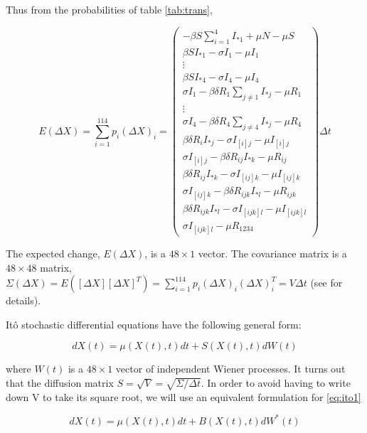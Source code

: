 \documentclass[12pt]{article}
\begin{document}
 



Thus from the probabilities of table \ref{tab:trans},

\begin{equation}
 E(\Delta X)=\sum_{i=1}^{114} p_i (\Delta X)_i=
\begin{pmatrix}
-\beta S \sum_{i=1}^4 I_{*1} + \mu N -\mu S\\
\beta S I_{*1} -\sigma I_1 -\mu I_1\\
\vdots\\
\beta S I_{*4} -\sigma I_4 -\mu I_4\\
\sigma I_1 - \beta \delta R_1 \sum_{j\neq 1} I_{*j} -\mu R_1\\
\vdots\\
\sigma I_4 - \beta \delta R_4 \sum_{j\neq 4} I_{*j} -\mu R_4\\
\beta \delta R_i I_{*j} - \sigma I_{[i]j} -\mu I_{[i]j}\\ 
\sigma I_{[i]j} - \beta \delta R_{ij} I_{*k} - \mu R_{ij}\\
\beta \delta R_{ij} I_{*k} -\sigma I_{[ij]k} -\mu I_{[ij]k}\\ 
\sigma I_{[ij]k} - \beta \delta R_{ijk} I_{*l} -\mu R_{ijk}\\
\beta \delta R_{ijk} I_{*l} - \sigma I_{[ijk]l} - \mu I_{[ijk]l} \\
\sigma I_{[ijk]l} - \mu R_{1234}
\end{pmatrix}
 \Delta t
\end{equation}

The expected change, $E(\Delta X)$, is a $48\times 1$ vector. The covariance 
matrix is a $48\times 48$ matrix, $\Sigma(\Delta X)= E([\Delta X][\Delta X]^T) 
=\sum_{i=1}^{114} p_i (\Delta X)_i (\Delta X)_i^T = V \Delta t$ (see 
\citet{allen_modeling_2007} for details).

Itô stochastic differential equations have the following general form:

\begin{equation}
\label{eq:ito1}
 d X(t) = \mu(X(t),t) dt + S(X(t),t) dW(t)
\end{equation}

where $W(t)$ is a $48\times1$ vector of independent Wiener processes. It turns 
out that the 
diffusion matrix $S=\sqrt{V} = \sqrt{\Sigma/\Delta t}$. In order to avoid 
having to write down V to take its square root, we will use an equivalent 
formulation for \ref{eq:ito1}

\begin{equation}
\label{eq:ito2}
 d X(t) = \mu(X(t),t) dt + B(X(t),t) dW^*(t)
\end{equation}
\end{document}
